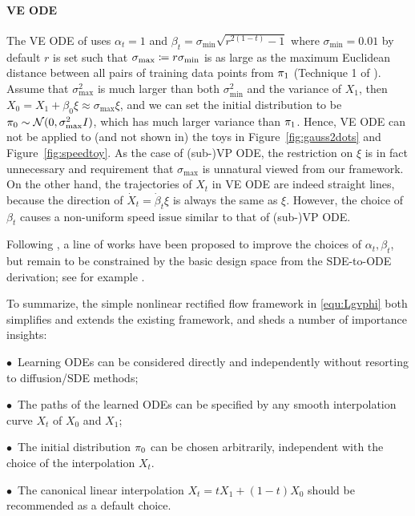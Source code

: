 \paragraph{VE ODE} 
The VE ODE  of  \cite{song2020score} 
uses  
$\alpha_t = 1$ and 
$\beta_t = \sigma_{\min}\sqrt{r^{2(1-t)}-1}$   
where $\sigma_{\min} =0.01$ by default $r$ is set such that   $\sigma_{\max} \coloneqq r\sigma_{\min}$ is as large as the maximum Euclidean distance between all pairs of training data points from ${\pi}_1$  (Technique 1 of \cite{song2020improved}). 
Assume that %
$\sigma_{\max}^2$ 
is much larger than both $\sigma_{\min}^2$ and the variance of $X_1$,  
then  $X_0 = X_1 + \beta_0 \xi \approx \sigma_{\max}\xi $, and 
we can set the  initial distribution to be  ${\pi}_0\sim \mathcal{N}(0,\sigma_{\max}^2 I)$, which has much larger variance than ${\pi}_1$. 
Hence, VE ODE can not be applied to (and not shown in) the toys in Figure~\ref{fig:gauss2dots} and Figure~\ref{fig:speedtoy}. 
As the case of (sub-)VP ODE, the restriction 
on $\xi$ is in fact unnecessary and requirement that $\sigma_{\max}$ is unnatural viewed from our framework. 
On the other hand, the trajectories of $X_t$ in VE ODE are indeed straight lines, 
because the direction of $\dot X_t = \dot \beta_t \xi$ is always the same as $\xi$. However, the choice of $\beta_t$ causes a  non-uniform speed issue similar to that of (sub-)VP ODE.  

Following \cite{song2020score, ho2020denoising}, a line of works have been proposed to improve the choices of $\alpha_t,\beta_t$, 
but remain to be constrained 
by the basic design space from the SDE-to-ODE derivation; see for example \cite{nichol2021improved, elucidating, zhang2022gddim}. 




To summarize, the simple nonlinear rectified flow framework in \eqref{equ:Lgvphi} 
both simplifies and extends the existing framework, and sheds a number of importance insights: %

$\bullet$~Learning ODEs can be considered directly and independently without resorting to diffusion/SDE methods; 

$\bullet$~The paths of the learned ODEs can be specified by any smooth interpolation curve $X_t$ of $X_0$ and $X_1$;  

$\bullet$~The initial distribution ${\pi}_0$ can be chosen arbitrarily, 
independent with the choice of 
the interpolation 
$X_t$.  

 $\bullet$~The canonical linear interpolation  $X_t = t X_1 + (1-t) X_0$ should be recommended as a default choice. 
 
